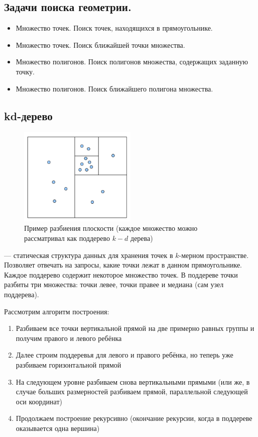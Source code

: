 \subsection{Задачи поиска геометрии.}
\begin{itemize}
  \item Множество точек. Поиск точек, находящихся в прямоугольнике.
  \item Множество точек. Поиск ближайшей точки множества.
  \item Множество полигонов. Поиск полигонов множества, содержащих заданную точку.
  \item Множество полигонов. Поиск ближайшего полигона множества.
\end{itemize}

\subsection{kd-дерево}
\begin{figure}[H]    
  \centering    
  \includegraphics[width=0.5\textwidth]{figures/kdTree.png}    
  \caption*{Пример разбиения плоскости (каждое множество можно рассматривал как поддерево $k-d$ дерева)}   
\end{figure} 
\begin{definition}
   --- статическая структура данных для хранения точек в $k$-мерном пространстве.
  Позволяет отвечать на запросы, какие точки лежат в данном прямоугольнике. Каждое поддерево содержит
  некоторое множество точек. В поддереве точки разбиты три множества: точки левее, точки правее и 
  медиана (сам узел поддерева).
\end{definition}

Рассмотрим алгоритм построения:
\begin{enumerate}
  \item Разбиваем все точки вертикальной прямой на две примерно равных группы и получим правого и левого
    ребёнка
  \item Далее строим поддеревья для левого и правого ребёнка, но теперь уже разбиваем горизонтальной прямой
  \item На следующем уровне разбиваем снова вертикальными прямыми (или же, в случае больших размерностей
    разбиваем прямой, параллельной следующей оси координат)
  \item Продолжаем построение рекурсивно (окончание рекурсии, когда в поддереве оказывается одна вершина)
\end{enumerate}

